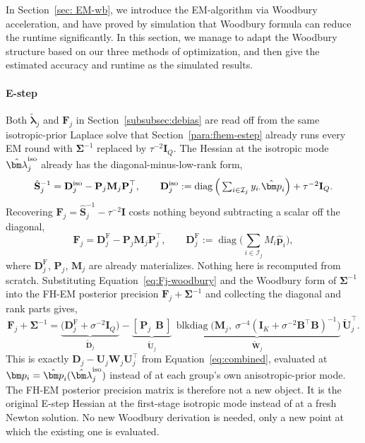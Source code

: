 In Section~\ref{sec: EM-wb}, we introduce the EM-algorithm via Woodbury acceleration, and have proved by simulation that Woodbury formula can reduce the runtime significantly. In this section, we manage to adapt the Woodbury structure based on our three methods of optimization, and then give the estimated accuracy and runtime as the simulated results.

\paragraph*{E-step}
Both $\tilde{\bm\lambda}_j$ and $\mathbf F_j$ in Section~\ref{subsubsec:debias} are read off from the same
isotropic-prior Laplace solve that Section~\ref{para:fhem-estep} already runs every EM round with
$\bm\Sigma^{-1}$ replaced by $\tau^{-2}\mathbf{I}_Q$. The Hessian at the isotropic mode
$\hat{\bm\lambda}_{j}^{\rm iso}$ already has the diagonal-minus-low-rank form,
\begin{equation}
    \hat{\mathbf S}_{j}^{-1}=\mathbf{D}_{j}^{\rm iso}-\mathbf{P}_{j}\mathbf{M}_{j}\mathbf{P}_{j}^\top,
    \qquad
    \mathbf{D}_{j}^{\rm iso}:=\operatorname{diag}\Big(\textstyle\sum_{i\in\mathcal I_j}y_{i\cdot}\hat{\bm p}_i\Big)+\tau^{-2}\mathbf I_Q.
    \label{eq:Shat-inv-iso}
\end{equation}
Recovering $\mathbf F_j=\hat{\mathbf S}_j^{-1}-\tau^{-2}\mathbf I$ costs nothing beyond subtracting a scalar
off the diagonal,
\begin{equation}
    \mathbf F_j=\mathbf D_j^{\mathrm F}-\mathbf P_j\mathbf M_j\mathbf P_j^\top,
    \qquad
    \mathbf D_j^{\mathrm F}:=\operatorname{diag}\Big(\textstyle\sum_{i\in\mathcal I_j}M_i\hat{\bm p}_i\Big),
    \label{eq:Fj-woodbury}
\end{equation}
where $\mathbf D_j^{\mathrm F}$, $\mathbf P_j$, $\mathbf M_j$ are already materializes. Nothing here is recomputed from scratch. Substituting Equation~\eqref{eq:Fj-woodbury} and the Woodbury form of $\bm\Sigma^{-1}$ into the FH-EM posterior precision $\mathbf F_j+\bm\Sigma^{-1}$ and collecting the diagonal and rank parts gives,
\begin{equation}
    \mathbf F_j+\bm\Sigma^{-1}
    =\underbrace{\big(\mathbf D_j^{\mathrm F}+\sigma^{-2}\mathbf I_Q\big)}_{\tilde{\mathbf D}_j}
    -\underbrace{[\,\mathbf P_j\ \ \mathbf B\,]}_{\tilde{\mathbf U}_j}\,
    \underbrace{\operatorname{blkdiag}\!\big(\mathbf M_j,\ \sigma^{-4}(\mathbf I_K+\sigma^{-2}\mathbf B^\top\mathbf B)^{-1}\big)}_{\tilde{\mathbf W}_j}\,
    \tilde{\mathbf U}_j^\top.
    \label{eq:fhem-Vj-decomp}
\end{equation}
This is exactly $\mathbf D_j-\mathbf U_j\mathbf W_j\mathbf U_j^\top$ from Equation~\eqref{eq:combined},
evaluated at $\bm p_i=\hat{\bm p}_i(\hat{\bm\lambda}_j^{\rm iso})$ instead of at each group's own anisotropic-prior
mode. The FH-EM posterior precision matrix is therefore not a new object. It is the original E-step Hessian at the first-stage isotropic mode instead of at a fresh Newton solution. No new Woodbury derivation is needed, only a new point at which the existing one is evaluated.

